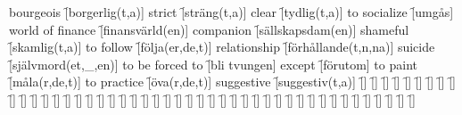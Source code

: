 \begin{questions}
\begin{multicols}{2}
        \question bourgeois \f[borgerlig(t,a)]
        \question strict \f[sträng(t,a)]
        \question clear \f[tydlig(t,a)]
        \question to socialize \f[umgås]
        \question world of finance \f[finansvärld(en)]
        \question companion \f[sällskapsdam(en)]
        \question shameful \f[skamlig(t,a)]
        \question to follow \f[följa(er,de,t)]
        \question relationship \f[förhållande(t,n,na)]
        \question suicide \f[självmord(et,\_,en)]
        \question to be forced to \f[bli tvungen]
        \question except \f[förutom]
        \question to paint \f[måla(r,de,t)]
        \question to practice \f[öva(r,de,t)]
        \question suggestive \f[suggestiv(t,a)]
        \question \f[]
        \question \f[]
        \question \f[]
        \question \f[]
        \question \f[]
        \question \f[]
        \question \f[]
        \question \f[]
        \question \f[]
        \question \f[]
        \question \f[]
        \question \f[]
        \question \f[]
        \question \f[]
        \question \f[]
        \question \f[]
        \question \f[]
        \question \f[]
        \question \f[]
        \question \f[]
        \question \f[]
        \question \f[]
        \question \f[]
        \question \f[]
        \question \f[]
        \question \f[]
        \question \f[]
        \question \f[]
        \question \f[]
        \question \f[]
        \question \f[]
        \question \f[]
        \question \f[]
        \question \f[]
        \question \f[]
        \question \f[]
        \question \f[]
        \question \f[]
        \question \f[]
        \question \f[]
        \question \f[]
        \question \f[]
        \question \f[]
        \question \f[]
        \question \f[]
        \question \f[]
    \end{multicols}
\end{questions}
